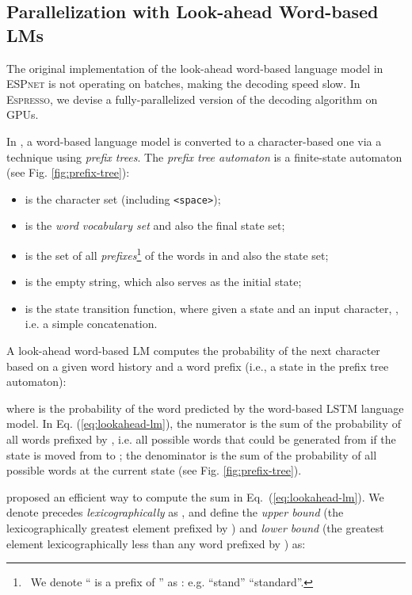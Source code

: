 \documentclass{article}
\def\espresso{\textsc{Espresso}\xspace}
\def\espnet{\textsc{ESPnet}\xspace}
\begin{document}
\subsection{Parallelization with Look-ahead Word-based LMs}
\label{sec:lookahead_lm}
The original implementation of the look-ahead word-based language model in \espnet \cite{watanabe2018espnet} is not operating on batches, making the decoding speed slow. In \espresso, we devise a fully-parallelized version of the decoding algorithm on GPUs.

In \cite{hori2018endtoend}, a word-based language model is converted to a character-based one via a technique using \emph{prefix trees}. The \emph{prefix tree automaton}  is a finite-state automaton (see Fig. \ref{fig:prefix-tree}):
\begin{itemize}
    \item  is the character set (including \texttt{<space>});
    \item  is the \emph{word vocabulary set} and also the final state set; 
    \item  is the set of all \emph{prefixes}\footnote{~We 
denote `` is a prefix of '' as : e.g. ``stand''  ``standard''. } of the words in  and also the state set; 
    \item  is the empty string, which also serves as the initial state;
    \item  is the state transition function, where given a state and an input character, , i.e. a simple concatenation. 
\end{itemize}

A look-ahead word-based LM computes the probability of the next character  based on a given word history  and a word prefix  (i.e., a state in the prefix tree automaton): 


\noindent where  is the probability of the word  predicted by the word-based LSTM language model. In Eq. (\ref{eq:lookahead-lm}), the numerator is the sum of the probability of all words prefixed by , i.e. all possible words that could be generated from  if the state is moved from  to ; the denominator is the sum of the probability of all possible words at the current state  (see Fig. \ref{fig:prefix-tree}).

\cite{hori2018endtoend} proposed an efficient way to compute the sum in Eq.~(\ref{eq:lookahead-lm}). We denote  precedes  \emph{lexicographically} as , and define the \emph{upper bound}  (the lexicographically greatest element prefixed by ) and \emph{lower bound}  (the greatest element lexicographically less than any word prefixed by ) as:
\end{document}
